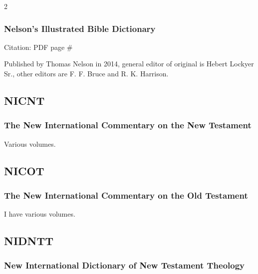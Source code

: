 \begin{multicols}{2}
		\subsubsection*{Nelson's Illustrated Bible Dictionary}
		
			Citation:
				PDF page \#
		
			Published by Thomas Nelson in 2014, general editor of original is Hebert Lockyer Sr., other editors are F. F. Bruce and R. K. Harrison.
			
	\subsection*{NICNT}
	
		\subsubsection*{The New International Commentary on the New Testament}
		
			Various volumes.
			
	\subsection*{NICOT}
	
		\subsubsection*{The New International Commentary on the Old Testament}
		
			I have various volumes.
		
	\subsection*{NIDNTT}
	
		\subsubsection*{New International Dictionary of New Testament Theology}
		

\end{multicols}
